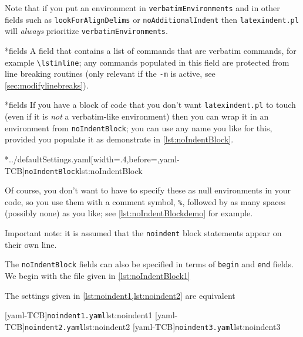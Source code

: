 	Note that if you put an environment in	\texttt{verbatimEnvironments} and in other fields such
	as \texttt{lookForAlignDelims} or \texttt{noAdditionalIndent} then \texttt{latexindent.pl} will
	\emph{always} prioritize  \texttt{verbatimEnvironments}.

*{fields}
	A field that contains a list of commands that are verbatim commands, for example
	\lstinline|\lstinline|; any commands populated in this field are protected from line
	breaking routines (only relevant if the \texttt{-m} is active, see
	\vref{sec:modifylinebreaks}).

*{fields}
	If you have a block of code that you don't want \texttt{latexindent.pl} to touch (even if
	 it is \emph{not} a verbatim-like environment) then
	you can wrap it in an environment from \texttt{noIndentBlock}; you can use any name you
	like for this, provided you populate it as demonstrate in \cref{lst:noIndentBlock}.

	\cmhlistingsfromfile[style=noIndentBlock]*{../defaultSettings.yaml}[width=.4\linewidth,before=\centering,yaml-TCB]{\texttt{noIndentBlock}}{lst:noIndentBlock}

	Of course, you don't want to have to specify these as null environments in your code, so
	you use them with a comment symbol, \lstinline!%!, followed by as many spaces
	(possibly none) as you like; see \cref{lst:noIndentBlockdemo} for example.


	Important note: it is assumed that the \texttt{noindent} block statements appear on
	their own line.

	The%
	 \texttt{noIndentBlock}
	fields can also be specified in terms of \texttt{begin} and
	\texttt{end} fields. We begin with the file given in \cref{lst:noIndentBlock1}


	The settings given in \cref{lst:noindent1,lst:noindent2} are equivalent

	\begin{cmhtcbraster}[raster columns=3,
			raster left skip=-3.5cm,
			raster right skip=-2cm,
			raster column skip=.03\linewidth]
		[yaml-TCB]{\texttt{noindent1.yaml}}{lst:noindent1}
		[yaml-TCB]{\texttt{noindent2.yaml}}{lst:noindent2}
		[yaml-TCB]{\texttt{noindent3.yaml}}{lst:noindent3}
	\end{cmhtcbraster}

